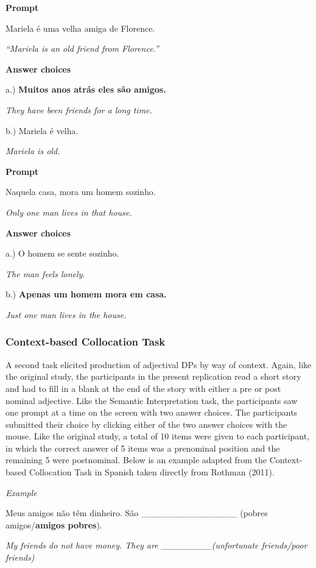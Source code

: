 \documentclass[
  man,floatsintext]{apa6}
\begin{document}
\textbf{Prompt}

Mariela é uma velha amiga de Florence.

\emph{``Mariela is an old friend from Florence.''}

\textbf{Answer choices}

a.) \textbf{Muitos anos atrás eles são amigos.}

\emph{They have been friends for a long time.}

b.) Mariela é velha.

\emph{Mariela is old.}

\textbf{Prompt}

Naquela casa, mora um homem sozinho.

\emph{Only one man lives in that house.}

\textbf{Answer choices}

a.) O homem se sente sozinho.

\emph{The man feels lonely.}

b.) \textbf{Apenas um homem mora em casa.}

\emph{Just one man lives in the house.}

\hypertarget{context-based-collocation-task}{%
\subsubsection{Context-based Collocation Task}\label{context-based-collocation-task}}

A second task elicited production of adjectival DPs by way of context.
Again, like the original study, the participants in the present replication read a short story and had to fill in a blank at the end of the story with either a pre or post nominal adjective.
Like the Semantic Interpretation task, the participants saw one prompt at a time on the screen with two answer choices.
The participants submitted their choice by clicking either of the two answer choices with the mouse.
Like the original study, a total of 10 items were given to each participant, in which the correct answer of 5 items was a prenominal position and the remaining 5 were postnominal.
Below is an example adapted from the Context-based Collocation Task in Spanish taken directly from Rothman (2011).

\emph{Example}

Meus amigos não têm dinheiro. São \_\_\_\_\_\_\_\_\_\_\_\_\_\_\_ (pobres amigos/\textbf{amigos pobres}).

\emph{My friends do not have money. They are \_\_\_\_\_\_\_\_(unfortunate friends/poor friends)}
\end{document}

